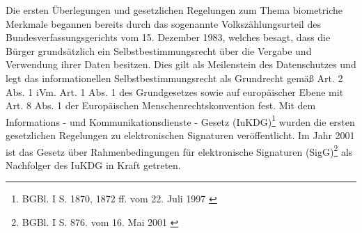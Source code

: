 Die ersten Überlegungen und gesetzlichen Regelungen zum Thema biometriche Merkmale begannen bereits durch
das sogenannte Volkszählungsurteil des Bundesverfassungsgerichts vom 15. Dezember 1983, welches besagt, dass
die Bürger grundsätzlich ein Selbstbestimmungsrecht über die Vergabe und Verwendung ihrer Daten besitzen.
Dies gilt als Meilenstein des Datenschutzes und legt das informationellen Selbstbestimmungsrecht als
Grundrecht gemäß Art. 2 Abs. 1 iVm. Art. 1 Abs. 1 des Grundgesetzes sowie auf europäischer Ebene mit Art. 8
Abs. 1 der Europäischen Menschenrechtskonvention fest. \cite{grundlagen1}\cite{grundlagen2}\cite{grundlagen3} 
Mit dem Informations - und Kommunikationsdienste - Gesetz (IuKDG)\footnote{\label{foot:2}BGBl. I S. 1870,
1872 ff. vom 22. Juli 1997 \cite{grundlagenFN1}} wurden die ersten gesetzlichen Regelungen zu elektronischen
Signaturen veröffentlicht. Im Jahr 2001 ist das Gesetz über Rahmenbedingungen für elektronische Signaturen
(SigG)\footnote{\label{foot:3}BGBl. I S. 876. vom 16. Mai 2001 \cite{grundlagenFN2}} als Nachfolger des
IuKDG in Kraft getreten. \cite{grundlagen4}
